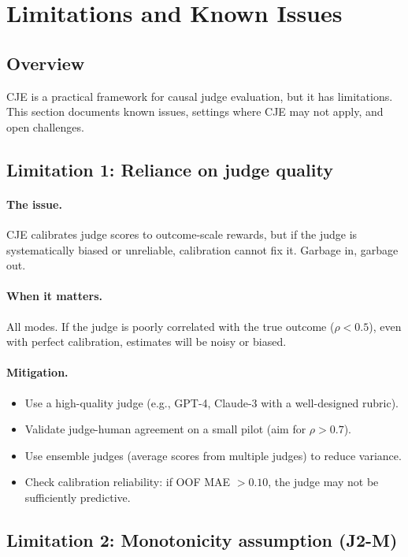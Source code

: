 \section{Limitations and Known Issues}

\subsection{Overview}

CJE is a practical framework for causal judge evaluation, but it has limitations. This section documents known issues, settings where CJE may not apply, and open challenges.

\subsection{Limitation 1: Reliance on judge quality}

\paragraph{The issue.} CJE calibrates judge scores to outcome-scale rewards, but if the judge is systematically biased or unreliable, calibration cannot fix it. Garbage in, garbage out.

\paragraph{When it matters.} All modes. If the judge is poorly correlated with the true outcome ($\rho < 0.5$), even with perfect calibration, estimates will be noisy or biased.

\paragraph{Mitigation.}
\begin{itemize}
\item Use a high-quality judge (e.g., GPT-4, Claude-3 with a well-designed rubric).
\item Validate judge-human agreement on a small pilot (aim for $\rho > 0.7$).
\item Use ensemble judges (average scores from multiple judges) to reduce variance.
\item Check calibration reliability: if OOF MAE $> 0.10$, the judge may not be sufficiently predictive.
\end{itemize}

\subsection{Limitation 2: Monotonicity assumption (J2-M)}

